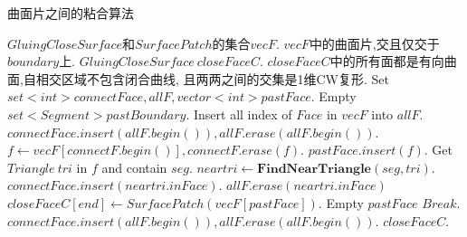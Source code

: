 \documentclass[a4paper]{book}
\renewcommand{\algorithmicrequire}{\textbf{输入:}}
\renewcommand{\algorithmicensure}{\textbf{输出:}}
\renewcommand{\algorithmicrequire}{\textbf{Input : }}
\renewcommand{\algorithmicrequire}{\textbf{Precondition : }}
\renewcommand{\algorithmicensure}{\textbf{Output : }}
\renewcommand{\algorithmicensure}{\textbf{Postcondition : }}
\numberwithin{equation}{chapter}
\theoremstyle{definition}
\begin{document}
\begin{algorithm}
	\caption{曲面片之间的粘合算法}
	\begin{algorithmic}[1]
		\renewcommand{\algorithmicrequire}{\textbf{Input : }}
		\Require $GluingCloseSurface$和$SurfacePatch$的集合$vecF$.
		\renewcommand{\algorithmicrequire}{\textbf{Precondition : }}
		\Require $vecF$中的曲面片,交且仅交于$boundary$上.
		\renewcommand{\algorithmicensure}{\textbf{Output : }}
		\Ensure $GluingCloseSurface\ closeFaceC$.
		\renewcommand{\algorithmicensure}{\textbf{Postcondition : }}
		\Ensure $closeFaceC$中的所有面都是有向曲面,自相交区域不包含闭合曲线,
		且两两之间的交集是1维CW复形.
		\State Set $set<int> connectFace,allF, vector<int> pastFace$.
		\State Empty $set<Segment> pastBoundary$.
		\State Insert all index of $Face$ in $vecF$ into $allF$. 
		\State $connectFace.insert(allF.begin()), allF.erase(allF.begin())$.
		\State $f \gets vecF[connectF.begin()], connectF.erase(f)$.
		\State $pastFace.insert(f)$.
		\State Get $Triangle\ tri$ in $f$ and contain $seg$.
		\State $neartri \gets \textbf{FindNearTriangle}(seg,tri)$.
		\State $connectFace.insert(neartri.inFace)$.
		\State $allF.erase(neartri.inFace)$
		\EndIf
		\EndFor
		\State $closeFaceC[end] \gets SurfacePatch(vecF[pastFace])$.
		\State Empty $pastFace$
		\State $Break$.
		\EndIf
		\State  $connectFace.insert(allF.begin()), allF.erase(allF.begin())$.
		\EndIf
		\EndWhile
		\State \Return $closeFaceC$.
		\EndFunction
	\end{algorithmic}
\end{algorithm}

		
		
		
		
		
\end{document}

